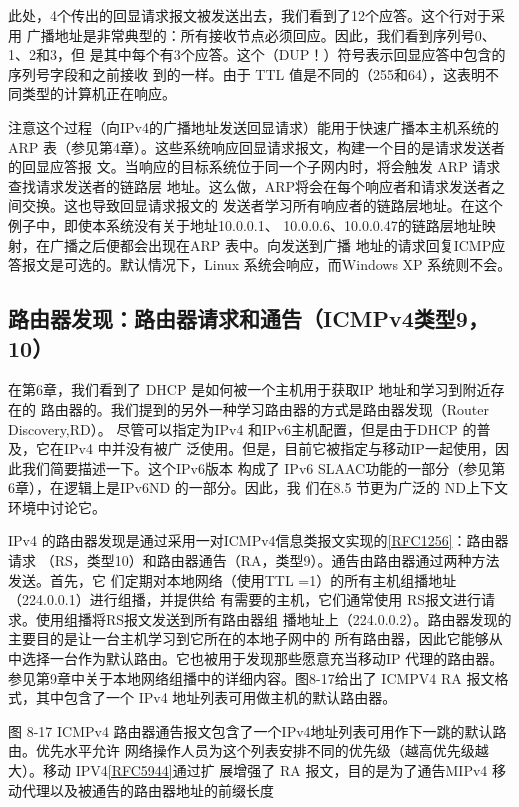 此处，4个传出的回显请求报文被发送出去，我们看到了12个应答。这个行对于采用
广播地址是非常典型的：所有接收节点必须回应。因此，我们看到序列号0、1、2和3，但
是其中每个有3个应答。这个（DUP！）符号表示回显应答中包含的序列号字段和之前接收
到的一样。由于 TTL 值是不同的（255和64），这表明不同类型的计算机正在响应。

注意这个过程（向IPv4的广播地址发送回显请求）能用于快速广播本主机系统的 ARP
表（参见第4章）。这些系统响应回显请求报文，构建一个目的是请求发送者的回显应答报
文。当响应的目标系统位于同一个子网内时，将会触发 ARP 请求查找请求发送者的链路层
地址。这么做，ARP将会在每个响应者和请求发送者之间交换。这也导致回显请求报文的
发送者学习所有响应者的链路层地址。在这个例子中，即使本系统没有关于地址10.0.0.1、
10.0.0.6、10.0.0.47的链路层地址映射，在广播之后便都会出现在ARP 表中。向发送到广播
地址的请求回复ICMP应答报文是可选的。默认情况下，Linux 系统会响应，而Windows XP
系统则不会。

\subsection{路由器发现：路由器请求和通告（ICMPv4类型9，10）}
在第6章，我们看到了 DHCP 是如何被一个主机用于获取IP 地址和学习到附近存在的
路由器的。我们提到的另外一种学习路由器的方式是路由器发现（Router Discovery,RD）。
尽管可以指定为IPv4 和IPv6主机配置，但是由于DHCP 的普及，它在IPv4 中并没有被广
泛使用。但是，目前它被指定与移动IP一起使用，因此我们简要描述一下。这个IPv6版本
构成了 IPv6 SLAAC功能的一部分（参见第6章），在逻辑上是IPv6ND 的一部分。因此，我
们在8.5 节更为广泛的 ND上下文环境中讨论它。

IPv4 的路由器发现是通过采用一对ICMPv4信息类报文实现的\href{https://www.rfc-editor.org/rfc/rfc1256}{[RFC1256]}：路由器请求
（RS，类型10）和路由器通告（RA，类型9）。通告由路由器通过两种方法发送。首先，它
们定期对本地网络（使用TTL =1）的所有主机组播地址（224.0.0.1）进行组播，并提供给
有需要的主机，它们通常使用 RS报文进行请求。使用组播将RS报文发送到所有路由器组
播地址上（224.0.0.2）。路由器发现的主要目的是让一台主机学习到它所在的本地子网中的
所有路由器，因此它能够从中选择一台作为默认路由。它也被用于发现那些愿意充当移动IP
代理的路由器。参见第9章中关于本地网络组播中的详细内容。图8-17给出了 ICMPV4 RA
报文格式，其中包含了一个 IPv4 地址列表可用做主机的默认路由器。

图 8-17 ICMPv4 路由器通告报文包含了一个IPv4地址列表可用作下一跳的默认路由。优先水平允许
网络操作人员为这个列表安排不同的优先级（越高优先级越大）。移动 IPV4\href{https://www.rfc-editor.org/rfc/rfc5944}{[RFC5944]}通过扩
展增强了 RA 报文，目的是为了通告MIPv4 移动代理以及被通告的路由器地址的前缀长度

